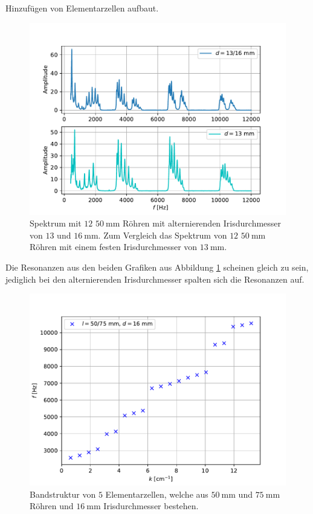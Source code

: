 Hinzufügen von Elementarzellen aufbaut.
\begin{figure}
  \centering
  \includegraphics[scale=0.5]{Messwerte/plot16.pdf}
  \caption{Spektrum mit $12$ $\SI{50}{\milli\meter}$ Röhren mit alternierenden Irisdurchmesser von $13$ und $\SI{16}{\milli\meter}$. Zum Vergleich
  das Spektrum von $12$ $\SI{50}{\milli\meter}$ Röhren mit einem festen Irisdurchmesser von $\SI{13}{\milli\meter}$.}
  \label{fig:plot16}
\end{figure}
Die Resonanzen aus den beiden Grafiken aus Abbildung \ref{fig:plot16} scheinen gleich zu sein, jediglich bei den alternierenden Irisdurchmesser spalten sich die
Resonanzen auf.
\begin{figure}
  \centering
  \includegraphics[scale=0.5]{Messwerte/plot17.pdf}
  \caption{Bandstruktur von $5$ Elementarzellen, welche aus $\SI{50}{\milli\meter}$ und $\SI{75}{\milli\meter}$ Röhren
  und $\SI{16}{\milli\meter}$ Irisdurchmesser bestehen.}
  \label{fig:plot17}
\end{figure}

